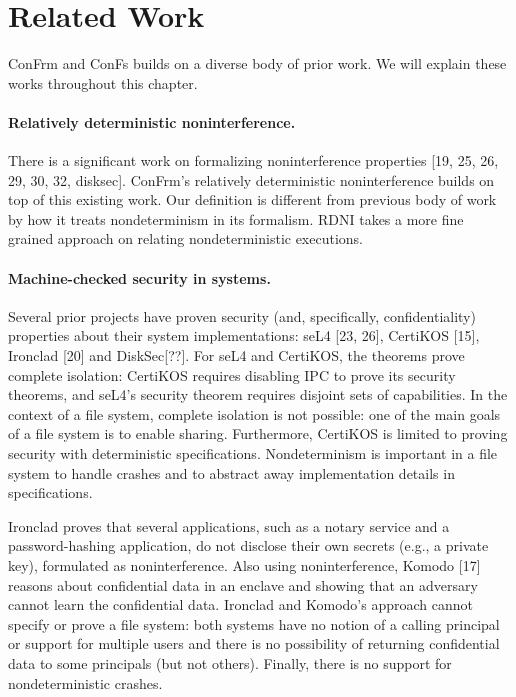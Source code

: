 \section{Related Work}

ConFrm and ConFs builds on a diverse body of prior work. We will explain these works throughout this chapter. 

\paragraph{Relatively deterministic noninterference.} There is a significant work on formalizing noninterference properties [19, 25, 26, 29, 30, 32, disksec]. ConFrm's relatively deterministic noninterference builds on top of this existing work. Our definition is different from previous body of work by how it treats nondeterminism in its formalism. RDNI takes a more fine grained approach on relating nondeterministic executions.

\paragraph{Machine-checked security in systems.} 
Several prior
projects have proven security (and, specifically, confidentiality) properties about their system implementations:
seL4 [23, 26], CertiKOS [15], Ironclad [20] and DiskSec[??]. For
seL4 and CertiKOS, the theorems prove complete isolation: CertiKOS requires disabling IPC to prove its security
theorems, and seL4’s security theorem requires disjoint
sets of capabilities. In the context of a file system, complete isolation is not possible: one of the main goals of a
file system is to enable sharing. Furthermore, CertiKOS
is limited to proving security with deterministic specifications. Nondeterminism is important in a file system
to handle crashes and to abstract away implementation
details in specifications.

Ironclad proves that several applications, such as a notary service and a password-hashing application, do not
disclose their own secrets (e.g., a private key), formulated as noninterference. Also using noninterference, Komodo [17] reasons about confidential data in an enclave
and showing that an adversary cannot learn the confidential data. Ironclad and Komodo’s approach cannot specify
or prove a file system: both systems have no notion of a
calling principal or support for multiple users and there
is no possibility of returning confidential data to some
principals (but not others). Finally, there is no support for
nondeterministic crashes.

